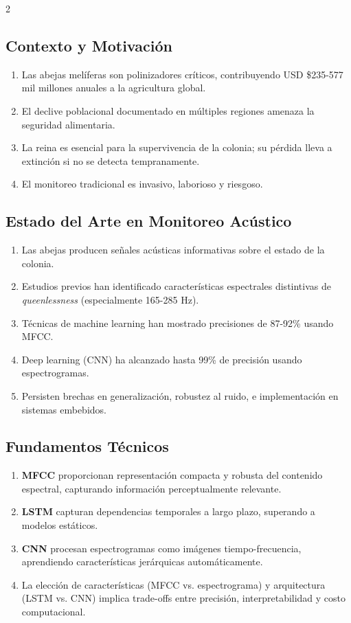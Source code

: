 \documentclass[12pt]{report}
\newenvironment{tightmulticols}{%
  \begin{multicols}{2}
  \setlength{\parskip}{1.2pt}
  \linespread{1}\selectfont
}{%
  \end{multicols}
}
\begin{document}
\begin{tightmulticols}
\subsection{Contexto y Motivación}

\begin{enumerate}
    \item Las abejas melíferas son polinizadores críticos, contribuyendo USD \$235-577 mil millones anuales a la agricultura global.
    \item El declive poblacional documentado en múltiples regiones amenaza la seguridad alimentaria.
    \item La reina es esencial para la supervivencia de la colonia; su pérdida lleva a extinción si no se detecta tempranamente.
    \item El monitoreo tradicional es invasivo, laborioso y riesgoso.
\end{enumerate}

\subsection{Estado del Arte en Monitoreo Acústico}

\begin{enumerate}
    \item Las abejas producen señales acústicas informativas sobre el estado de la colonia.
    \item Estudios previos han identificado características espectrales distintivas de \textit{queenlessness} (especialmente 165-285 Hz).
    \item Técnicas de machine learning han mostrado precisiones de 87-92\% usando MFCC.
    \item Deep learning (CNN) ha alcanzado hasta 99\% de precisión usando espectrogramas.
    \item Persisten brechas en generalización, robustez al ruido, e implementación en sistemas embebidos.
\end{enumerate}

\subsection{Fundamentos Técnicos}

\begin{enumerate}
    \item \textbf{MFCC} proporcionan representación compacta y robusta del contenido espectral, capturando información perceptualmente relevante.
    \item \textbf{LSTM} capturan dependencias temporales a largo plazo, superando a modelos estáticos.
    \item \textbf{CNN} procesan espectrogramas como imágenes tiempo-frecuencia, aprendiendo características jerárquicas automáticamente.
    \item La elección de características (MFCC vs. espectrograma) y arquitectura (LSTM vs. CNN) implica trade-offs entre precisión, interpretabilidad y costo computacional.
\end{enumerate}


\end{tightmulticols}
\end{document}
